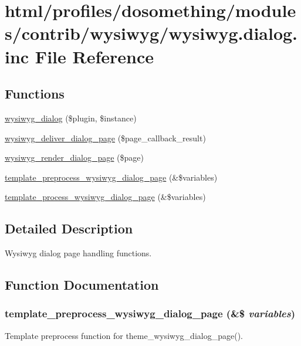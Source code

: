 \hypertarget{wysiwyg_8dialog_8inc}{
\section{html/profiles/dosomething/modules/contrib/wysiwyg/wysiwyg.dialog.inc File Reference}
\label{wysiwyg_8dialog_8inc}
}
\subsection*{Functions}
\begin{DoxyCompactItemize}
\item 
\hyperlink{wysiwyg_8dialog_8inc_a57c7ce003075f4a07b9a555a822755b8}{wysiwyg\_\-dialog} (\$plugin, \$instance)
\item 
\hyperlink{wysiwyg_8dialog_8inc_a11742186be99db206b09a5682afa2130}{wysiwyg\_\-deliver\_\-dialog\_\-page} (\$page\_\-callback\_\-result)
\item 
\hyperlink{wysiwyg_8dialog_8inc_a7c9acb68c62f91fa07a346e18d70407f}{wysiwyg\_\-render\_\-dialog\_\-page} (\$page)
\item 
\hyperlink{wysiwyg_8dialog_8inc_a01e89cc085ea9214d877749b55f50639}{template\_\-preprocess\_\-wysiwyg\_\-dialog\_\-page} (\&\$variables)
\item 
\hyperlink{wysiwyg_8dialog_8inc_ac59a9d7f504a104da018256132f53b60}{template\_\-process\_\-wysiwyg\_\-dialog\_\-page} (\&\$variables)
\end{DoxyCompactItemize}


\subsection{Detailed Description}
Wysiwyg dialog page handling functions. 

\subsection{Function Documentation}
\hypertarget{wysiwyg_8dialog_8inc_a01e89cc085ea9214d877749b55f50639}{
\subsubsection[{template\_\-preprocess\_\-wysiwyg\_\-dialog\_\-page}]{\setlength{\rightskip}{0pt plus 5cm}template\_\-preprocess\_\-wysiwyg\_\-dialog\_\-page (\&\$ {\em variables})}}
\label{wysiwyg_8dialog_8inc_a01e89cc085ea9214d877749b55f50639}
Template preprocess function for theme\_\-wysiwyg\_\-dialog\_\-page().

